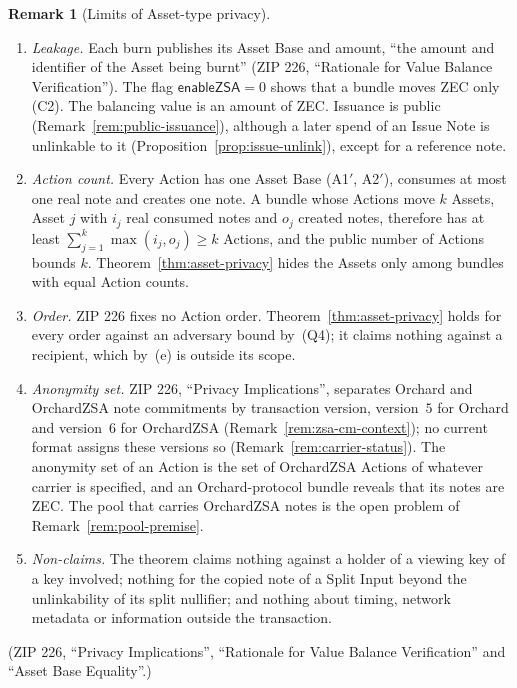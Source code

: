 \documentclass[11pt,a4paper]{article}
\theoremstyle{definition}
\newtheorem{remark}[theorem]{Remark}
\begin{document}
\begin{remark}[Limits of Asset-type privacy]\label{rem:privacy-limits}
\leavevmode
\begin{enumerate}
\item[(a)] \emph{Leakage.} Each burn publishes its Asset Base and amount,
  ``the amount and identifier of the Asset being burnt'' (ZIP 226,
  ``Rationale for Value Balance Verification''). The flag $\mathsf{enableZSA} =
  0$ shows that a bundle moves ZEC only (C2). The balancing value is an amount
  of ZEC. Issuance is public (Remark~\ref{rem:public-issuance}), although a
  later spend of an Issue Note is unlinkable to it
  (Proposition~\ref{prop:issue-unlink}), except for a reference note.
\item[(b)] \emph{Action count.} Every Action has one Asset Base (A1$'$,
  A2$'$), consumes at most one real note and creates one note. A bundle
  whose Actions move $k$ Assets, Asset $j$ with $i_j$ real consumed notes
  and $o_j$ created notes, therefore has at least
  $\sum_{j=1}^{k} \max(i_j, o_j) \ge k$ Actions, and the public number of
  Actions bounds $k$. Theorem~\ref{thm:asset-privacy} hides the Assets only
  among bundles with equal Action counts.
\item[(c)] \emph{Order.} ZIP 226 fixes no Action order.
  Theorem~\ref{thm:asset-privacy} holds for every order against an
  adversary bound by~(Q4); it claims nothing against a recipient, which
  by~(e) is outside its scope.
\item[(d)] \emph{Anonymity set.} ZIP 226, ``Privacy Implications'',
  separates Orchard and OrchardZSA note commitments by transaction version,
  version~$5$ for Orchard and version~$6$ for OrchardZSA
  (Remark~\ref{rem:zsa-cm-context}); no current format assigns these
  versions so (Remark~\ref{rem:carrier-status}). The anonymity set of an
  Action is the set of OrchardZSA Actions of whatever carrier is specified,
  and an Orchard-protocol bundle reveals that its notes are ZEC. The pool
  that carries
  OrchardZSA notes is the open problem of Remark~\ref{rem:pool-premise}.
\item[(e)] \emph{Non-claims.} The theorem claims nothing against a holder
  of a viewing key of a key involved; nothing for the copied note of a
  Split Input beyond the unlinkability of its split nullifier; and nothing
  about timing, network metadata or information outside the transaction.
\end{enumerate}
(ZIP 226, ``Privacy Implications'', ``Rationale for Value Balance
Verification'' and ``Asset Base Equality''.)
\end{remark}
\end{document}
